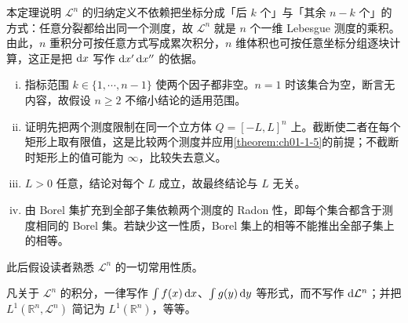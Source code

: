 \documentclass[../../main.tex]{subfiles}%
\begin{document}
\begin{remark}\label{remark:ch01-thm-1-23-动机}
本定理说明 $\mathcal{L}^n$ 的归纳定义不依赖把坐标分成「后 $k$ 个」与「其余 $n-k$ 个」的方式：任意分裂都给出同一个测度，故 $\mathcal{L}^n$ 就是 $n$ 个一维 Lebesgue 测度的乘积。由此，$n$ 重积分可按任意方式写成累次积分，$n$ 维体积也可按任意坐标分组逐块计算，这正是把 $\mathrm{d} x$ 写作 $\mathrm{d} x'\,\mathrm{d} x''$ 的依据。
\end{remark}

\begin{remark}\label{remark:ch01-thm-1-23-条件}
\begin{enumerate}[(i)]
\item 指标范围 $k\in\{1,\cdots,n-1\}$ 使两个因子都非空。$n=1$ 时该集合为空，断言无内容，故假设 $n\geqslant2$ 不缩小结论的适用范围。
\item 证明先把两个测度限制在同一个立方体 $Q=[-L,L]^n$ 上。截断使二者在每个矩形上取有限值，这是比较两个测度并应用\cref{theorem:ch01-1-5}的前提；不截断时矩形上的值可能为 $\infty$，比较失去意义。%
\item $L>0$ 任意，结论对每个 $L$ 成立，故最终结论与 $L$ 无关。
\item 由 Borel 集扩充到全部子集依赖两个测度的 Radon 性，即每个集合都含于测度相同的 Borel 集。若缺少这一性质，Borel 集上的相等不能推出全部子集上的相等。
\end{enumerate}
\end{remark}

此后假设读者熟悉 $\mathcal{L}^n$ 的一切常用性质。

\begin{remark}\label{remark:ch01-thm-1-23-记号}
凡关于 $\mathcal{L}^n$ 的积分，一律写作 $\int f(x)\,\mathrm{d} x$、$\int g(y)\,\mathrm{d} y$ 等形式，而不写作 $\mathrm{d}\mathcal{L}^n$；并把 $L^1(\mathbb{R}^n,\mathcal{L}^n)$ 简记为 $L^1(\mathbb{R}^n)$，等等。
\end{remark}
\end{document}
